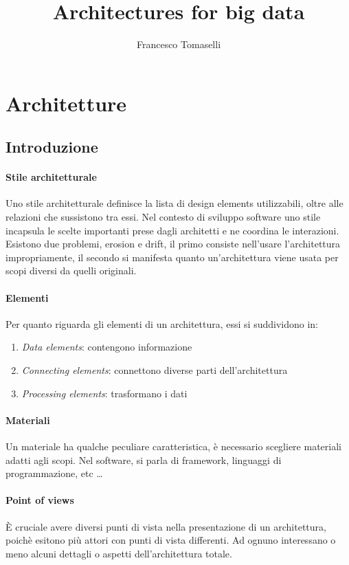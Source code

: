 \documentclass[a4paper]{article}
\title{Architectures for big data}
\author{Francesco Tomaselli}
\begin{document}
\maketitle
\tableofcontents
\setlength{\parindent}{0pt}
\setlength{\parskip}{0.8em}
\newpage
\section{Architetture}
\subsection{Introduzione}

\paragraph{Stile architetturale}
Uno stile architetturale definisce la lista di design elements utilizzabili, 
oltre alle relazioni che sussistono tra essi. Nel contesto di sviluppo software 
uno stile incapsula le scelte importanti prese dagli architetti e ne coordina le 
interazioni.
Esistono due problemi, erosion e drift, il primo consiste nell'usare l'architettura 
impropriamente, il secondo si manifesta quanto un'architettura viene usata per scopi 
diversi da quelli originali.

\paragraph{Elementi}
Per quanto riguarda gli elementi di un architettura, essi si suddividono in:
\begin{enumerate}
    \item \emph{Data elements}: contengono informazione
    \item \emph{Connecting elements}: connettono diverse parti dell'architettura
    \item \emph{Processing elements}: trasformano i dati
\end{enumerate}

\paragraph{Materiali}
Un materiale ha qualche peculiare caratteristica, è necessario scegliere materiali
adatti agli scopi. Nel software, si parla di framework, linguaggi di programmazione, etc \dots

\paragraph{Point of views}
È cruciale avere diversi punti di vista nella presentazione di un architettura, poichè 
esitono più attori con punti di vista differenti.
Ad ognuno interessano o meno alcuni dettagli o aspetti dell'architettura totale.
\end{document}
